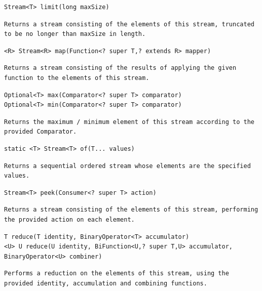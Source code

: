 \documentclass[5pt, portrait]{article}
\begin{document}
\begin{verbatim}
Stream<T> limit(long maxSize)
\end{verbatim}
\begin{verbatim}
Returns a stream consisting of the elements of this stream, truncated to be no longer than maxSize in length.
\end{verbatim} 

\begin{verbatim}
<R> Stream<R> map(Function<? super T,? extends R> mapper)
\end{verbatim}
\begin{verbatim}
Returns a stream consisting of the results of applying the given function to the elements of this stream.
\end{verbatim} 

\begin{verbatim}
Optional<T> max(Comparator<? super T> comparator)
Optional<T> min(Comparator<? super T> comparator)
\end{verbatim}
\begin{verbatim}
Returns the maximum / minimum element of this stream according to the provided Comparator.
\end{verbatim} 

\begin{verbatim}
static <T> Stream<T> of(T... values)
\end{verbatim}
\begin{verbatim}
Returns a sequential ordered stream whose elements are the specified values.
\end{verbatim} 

\begin{verbatim}
Stream<T> peek(Consumer<? super T> action)
\end{verbatim}
\begin{verbatim}
Returns a stream consisting of the elements of this stream, performing the provided action on each element.
\end{verbatim} 

\begin{verbatim}
T reduce(T identity, BinaryOperator<T> accumulator)
<U> U reduce(U identity, BiFunction<U,? super T,U> accumulator, BinaryOperator<U> combiner)
\end{verbatim}
\begin{verbatim}
Performs a reduction on the elements of this stream, using the provided identity, accumulation and combining functions.
\end{verbatim} 
\end{document}
